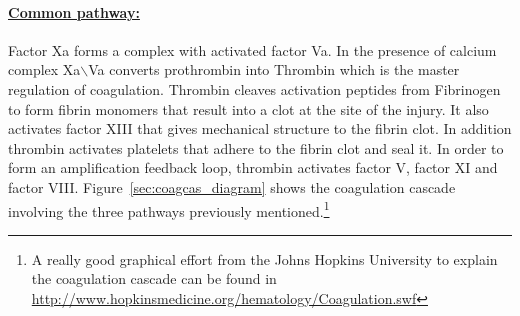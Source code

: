 \documentclass[%
 nofootinbib,
 amsmath,amssymb,
 aps,
 pra,
]{revtex4-1}
\begin{document}
\paragraph{\underline{Common pathway:}}
Factor Xa forms a complex with activated factor Va. In the presence of calcium complex Xa$\backslash$Va converts prothrombin into Thrombin which is the master regulation of coagulation. Thrombin cleaves activation peptides from Fibrinogen to form fibrin monomers that result into a clot at the site of the injury. It also activates factor XIII that gives mechanical structure to the fibrin clot. In addition thrombin activates platelets that adhere to the fibrin clot and seal it. In order to form an amplification feedback loop, thrombin activates factor V, factor XI and factor VIII. Figure~\ref{sec:coagcas_diagram} shows the coagulation cascade involving the three pathways previously mentioned.\footnote{A really good graphical effort from the Johns Hopkins University to explain the coagulation cascade can be found in \url{http://www.hopkinsmedicine.org/hematology/Coagulation.swf}}\\
\end{document}
